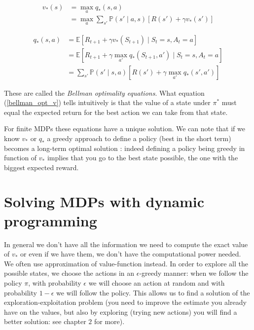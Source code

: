 \documentclass[14pt,a4paper]{article}
\theoremstyle{definition}
\begin{document}
\begin{equation}
\begin{split}
v_{*}(s)&=\max_{a}q_{*}(s,a)
\\&=\max_{a} \sum_{s'}\mathbb{P}(s'\mid a,s)\left[R(s')+\gamma v_{*}(s')\right]
\end{split}
\label{bellman_opt_v}
\end{equation}

\begin{equation}
\begin{split}
q_{*}(s,a)&=\mathbb{E}\left[ R_{t+1} + \gamma v_{*}(S_ {t+1}) \mid S_t = s, A_t = a \right]
\\&=\mathbb{E}\left[ R_{t+1} + \gamma \max_{a'} q_{*}(S_{t+1},a') \mid S_t = s, A_t = a \right]
\\&= \sum_{s'}\mathbb{P}(s' \mid s,a)[R(s')+\gamma \max_{a'}q_{*}(s',a')]
\end{split}
\label{bellman_opt_q}
\end{equation}

These are called the \emph{Bellman optimality equations}. What equation (\ref{bellman_opt_v}) tells intuitively is that the value of a state under $\pi^*$ must equal the expected return for the best action we can take from that state.


For finite MDPs these equations have a unique solution. We can note that if we know $v_{*}$ or $q_{*}$ a greedy approach to define a policy (best in the short term) becomes a long-term optimal solution : indeed defining a policy being greedy in function of $v_*$ implies that you go to the best state possible, the one with the biggest expected reward.


\section{Solving MDPs with dynamic programming}

In general we don't have all the information we need to compute the exact value of $v_{*}$ or even if we have them, we don't have the computational power needed. We often use approximation of value-function instead. In order to explore all the possible states, we choose the actions in an $\epsilon$-greedy manner: when we follow the policy $\pi$, with probability $\epsilon$ we will choose an action at random and with probability $1-\epsilon$ we will follow the policy. This allows us to find a solution of the exploration-exploitation problem (you need to improve the estimate you already have on the values, but also by exploring (trying new actions) you will find a better solution: see \citep{Sutton} chapter $2$ for more).
\end{document}
